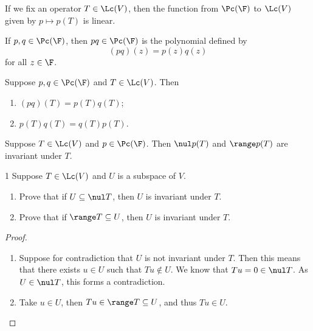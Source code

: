 \documentclass{extarticle}
\begin{document}
\begin{remark}
    If we fix an operator \(T \in \Lc(V)\), then the function from \(\Pc(\F)\) to \(\Lc(V)\)
    given by \(p \mapsto p(T)\) is linear. 
\end{remark}

\begin{definition}
    If \(p, q \in \Pc(\F)\), then \(pq \in \Pc(\F)\) is the polynomial defined by 
    \[(pq)(z) = p(z)q(z)\]
    for all \(z \in \F\).
\end{definition}

\begin{thm}
    Suppose \(p, q \in \Pc(\F)\) and \(T \in \Lc(V)\). Then 
    \begin{enumerate}[label=(\alph*)]
        \item \((pq)(T) = p(T) q(T)\);
        \item \(p(T)q(T) = q(T)p(T)\).
    \end{enumerate}
\end{thm}

\begin{definition}
    Suppose \(T \in \Lc(V)\) and \(p \in \Pc(\F)\). Then \(\nul p(T)\) and \(\range p(T)\)
    are invariant under \(T\).
\end{definition}


\newpage 
{}

\begin{problem}{1}
    Suppose \(T \in \Lc(V)\) and \(U\) is a subspace of \(V\). 
    \begin{enumerate}[label=(\alph*)]
        \item Prove that if \(U \subseteq \nul T\), then \(U\) is invariant under \(T\). 
        \item Prove that if \(\range T \subseteq U\), then \(U\) is invariant under \(T\).
    \end{enumerate}
\end{problem}

\begin{proof}
\begin{enumerate}[label=(\alph*)]
    \item  Suppose for contradiction that \(U\) is not invariant under \(T\). Then this means 
    that there exists \(u \in U\) such that \(T u \notin U\). We know that \(Tu = 0 \in \nul T\). 
    As \(U \in \nul T\), this forms a contradiction. 
    
    \item Take \(u \in U\), then \(Tu \in \range T \subseteq U\), and thus \(Tu \in U\).
\end{enumerate}
\end{proof}
\end{document}
